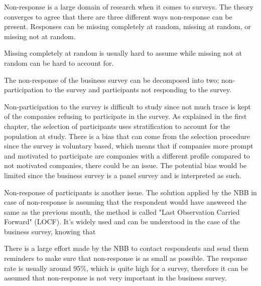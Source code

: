 \documentclass[12pt,a4paper,oneside]{book}
\begin{document}
Non-response is a large domain of research when it comes to surveys. 
The theory converges to agree that there are three different ways non-response can be present. Responses can be missing completely at random, missing at random, or missing not at random.

Missing completely at random is usually hard to assume while missing not at random can be hard to account for.


The non-response of the business survey can be decomposed into two; non-participation to the survey and participants not responding to the survey.

Non-participation to the survey is difficult to study since not much trace is kept of the companies refusing to participate in the survey. As explained in the first chapter, the selection of participants uses stratification to account for the population at study. 
There is a bias that can come from the selection procedure since the survey is voluntary based, which means that if companies more prompt and motivated to participate are companies with a different profile compared to not motivated companies, there could be an issue.
The potential bias would be limited since the business survey is a panel survey and is interpreted as such.

Non-response of participants is another issue. 
The solution applied by the NBB in case of non-response is assuming that the respondent would have answered the same as the previous month, the method is called "Last Observation Carried Forward" (LOCF). 
It's widely used and can be understood in the case of the business survey, knowing that 

There is a large effort made by the NBB to contact respondents and send them reminders to make sure that non-response is as small as possible.
The response rate is usually around 95\%, which is quite high for a survey, therefore it can be assumed that non-response is not very important in the business survey.

\end{document}
